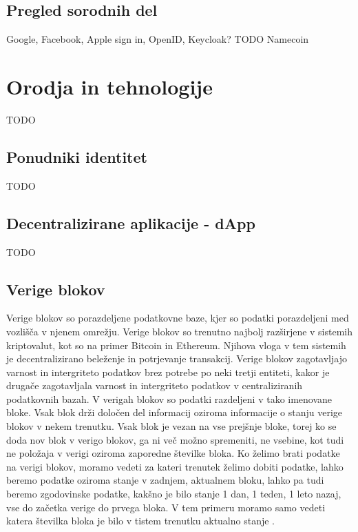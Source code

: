 \documentclass[a4paper,12pt,openright]{book}
\begin{document}
\section{Pregled sorodnih del}
Google, Facebook, Apple sign in, OpenID, Keycloak?
TODO
Namecoin


\chapter{Orodja in tehnologije}
TODO

\section{Ponudniki identitet}
TODO

\section{Decentralizirane aplikacije - dApp}
TODO

\section{Verige blokov}
Verige blokov so porazdeljene podatkovne baze, kjer so podatki porazdeljeni med vozlišča v njenem omrežju.
Verige blokov so trenutno najbolj razširjene v sistemih kriptovalut, kot so na primer Bitcoin in Ethereum.
Njihova vloga v tem sistemih je decentralizirano beleženje in potrjevanje transakcij.
Verige blokov zagotavljajo varnost in intergriteto podatkov brez potrebe po neki tretji entiteti, kakor je drugače zagotavljala varnost in intergriteto podatkov v centraliziranih podatkovnih bazah.
V verigah blokov so podatki razdeljeni v tako imenovane bloke.
Vsak blok drži določen del informacij oziroma informacije o stanju verige blokov v nekem trenutku.
Vsak blok je vezan na vse prejšnje bloke, torej ko se doda nov blok v verigo blokov, ga ni več možno spremeniti, ne vsebine, kot tudi ne položaja v verigi oziroma zaporedne številke bloka.
Ko želimo brati podatke na verigi blokov, moramo vedeti za kateri trenutek želimo dobiti podatke, lahko beremo podatke oziroma stanje v zadnjem, aktualnem bloku, lahko pa tudi beremo zgodovinske podatke, kakšno je bilo stanje 1 dan, 1 teden, 1 leto nazaj, vse do začetka verige do prvega bloka.
V tem primeru moramo samo vedeti katera številka bloka je bilo v tistem trenutku aktualno stanje \cite{blockchain_explained_investopedia}.
\end{document}

